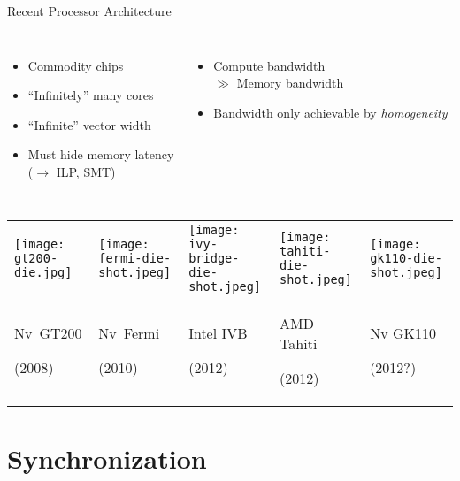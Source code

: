 \documentclass[english,compress]{beamer}
\begin{document}
\begin{frame}{Recent Processor Architecture}
  \begin{columns}
      \begin{itemize}
      \item Commodity chips
      \item ``Infinitely'' many cores
      \item ``Infinite'' vector width
      \item Must hide memory latency\\
        ($\rightarrow$ ILP, SMT)
      \end{itemize}
      \begin{itemize}
      \item Compute bandwidth\\
        \hfill $\gg$ Memory bandwidth
      \item Bandwidth only achievable by \emph{homogeneity}
      \end{itemize}
      \vspace*{3.5ex}
  \end{columns}
  \hspace*{-0.25\textwidth}
  \begin{tabular}{p{}p{}p{}p{}p{}}
  \texttt{[image: gt200-die.jpg]}
  &
  \texttt{[image: fermi-die-shot.jpeg]}
  &
  \centering
  \texttt{[image: ivy-bridge-die-shot.jpeg]}
  &
  \texttt{[image: tahiti-die-shot.jpeg]}
  &
  \texttt{[image: gk110-die-shot.jpeg]}
  \\
  \centering Nv~GT200\par(2008)
  &
  \centering Nv~Fermi\par(2010)
  &
  \centering Intel IVB\par(2012)
  &
  \centering AMD Tahiti \par(2012)
  &
  \centering Nv GK110\par(2012?)
  \end{tabular}
\end{frame}
\section{Synchronization}



\questionframe{}
\imagecreditslide
\end{document}
